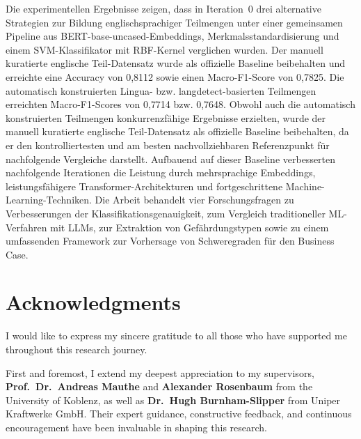 \documentclass[11pt, titlepage, bibliography=totoc]{scrreprt}
\begin{document}
Die experimentellen Ergebnisse zeigen, dass in Iteration~0 drei alternative Strategien zur Bildung englischsprachiger Teilmengen unter einer gemeinsamen Pipeline aus BERT-base-uncased-Embeddings, Merkmalsstandardisierung und einem SVM-Klassifikator mit RBF-Kernel verglichen wurden. Der manuell kuratierte englische Teil-Datensatz wurde als offizielle Baseline beibehalten und erreichte eine Accuracy von 0{,}8112 sowie einen Macro-F1-Score von 0{,}7825. Die automatisch konstruierten Lingua- bzw. langdetect-basierten Teilmengen erreichten Macro-F1-Scores von 0{,}7714 bzw. 0{,}7648. Obwohl auch die automatisch konstruierten Teilmengen konkurrenzfähige Ergebnisse erzielten, wurde der manuell kuratierte englische Teil-Datensatz als offizielle Baseline beibehalten, da er den kontrolliertesten und am besten nachvollziehbaren Referenzpunkt für nachfolgende Vergleiche darstellt. Aufbauend auf dieser Baseline verbesserten nachfolgende Iterationen die Leistung durch mehrsprachige Embeddings, leistungsfähigere Transformer-Architekturen und fortgeschrittene Machine-Learning-Techniken. Die Arbeit behandelt vier Forschungsfragen zu Verbesserungen der Klassifikationsgenauigkeit, zum Vergleich traditioneller ML-Verfahren mit LLMs, zur Extraktion von Gefährdungstypen sowie zu einem umfassenden Framework zur Vorhersage von Schweregraden für den Business Case.

\cleardoublepage

\tableofcontents
\thispagestyle{empty}
\singlespacing
\cleardoublepage
{}

\chapter*{Acknowledgments}

I would like to express my sincere gratitude to all those who have supported me throughout this research journey.

First and foremost, I extend my deepest appreciation to my supervisors, \textbf{Prof.\ Dr.\ Andreas Mauthe} and \textbf{Alexander Rosenbaum} from the University of Koblenz, as well as \textbf{Dr.\ Hugh Burnham-Slipper} from Uniper Kraftwerke GmbH. Their expert guidance, constructive feedback, and continuous encouragement have been invaluable in shaping this research.
\end{document}
